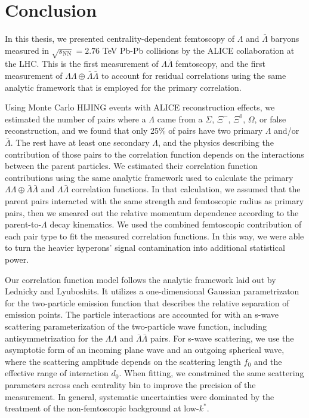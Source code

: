 \section{Conclusion}
\label{sec:Conclusion}

In this thesis, we presented centrality-dependent femtoscopy of $\Lambda$ and $\bar{\Lambda}$ baryons measured in $\sqrt{s_\mathrm{NN}} = 2.76$ TeV Pb-Pb collisions by the ALICE collaboration at the LHC.
This is the first measurement of $\Lambda\bar{\Lambda}$ femtoscopy, and the first measurement of $\Lambda\Lambda\oplus\bar{\Lambda}\bar{\Lambda}$ to account for residual correlations using the same analytic framework that is employed for the primary correlation.

Using Monte Carlo HIJING events with ALICE reconstruction effects, we estimated the number of pairs where a $\Lambda$ came from a $\Sigma$, $\Xi^-$, $\Xi^0$, $\Omega$, or false reconstruction, and we found that only 25\% of pairs have two primary $\Lambda$ and/or $\bar{\Lambda}$.
The rest have at least one secondary $\Lambda$, and the physics describing the contribution of those pairs to the correlation function depends on the interactions between the parent particles.
We estimated their correlation function contributions using the same analytic framework used to calculate the primary $\Lambda\Lambda\oplus\bar{\Lambda}\bar{\Lambda}$ and $\Lambda\bar{\Lambda}$ correlation functions.
In that calculation, we assumed that the parent pairs interacted with the same strength and femtoscopic radius as primary pairs, then we smeared out the relative momentum dependence according to the parent-to-$\Lambda$ decay kinematics.
We used the combined femtoscopic contribution of each  pair type to fit the measured correlation functions.
In this way, we were able to turn the heavier hyperons' signal contamination into additional statistical power.

Our correlation function model follows the analytic framework laid out by Lednicky and Lyuboshits.
It utilizes a one-dimensional Gaussian parametrizaton  for the two-particle emission function that describes the relative separation of emission points.
The particle interactions are accounted for with an s-wave scattering parameterization of the two-particle wave function, including antisymmetrization for the $\Lambda\Lambda$ and $\bar{\Lambda}\bar{\Lambda}$ pairs.
For s-wave scattering, we use the asymptotic form of an incoming plane wave and an outgoing spherical wave, where the scattering amplitude depends on the scattering length $f_0$ and the effective range of interaction $d_0$.
When fitting, we constrained the same scattering parameters across each centrality bin to improve the precision of the measurement.
In general, systematic uncertainties were dominated by the treatment of the non-femtoscopic background at low-$k^*$.

